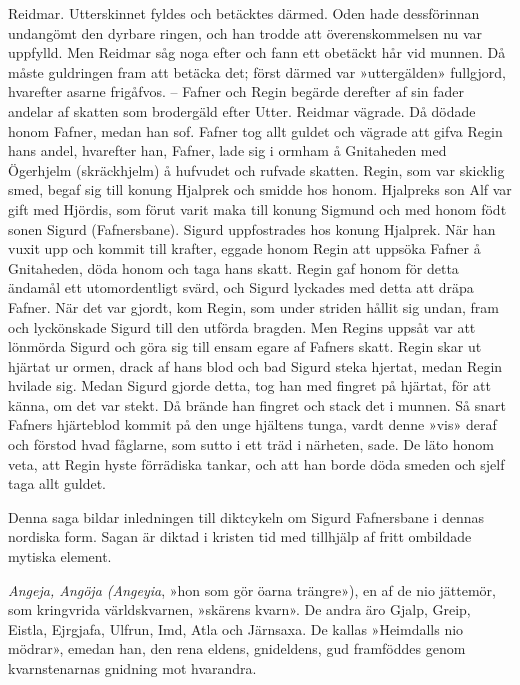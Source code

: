 Reidmar. Utterskinnet fyldes och betäcktes därmed. Oden hade
dessförinnan undangömt den dyrbare ringen, och han trodde att
överenskommelsen nu var uppfylld. Men Reidmar såg noga efter och fann
ett obetäckt hår vid munnen. Då måste guldringen fram att betäcka det;
först därmed var »uttergälden» fullgjord, hvarefter asarne frigåfvos. --
Fafner och Regin begärde derefter af sin fader andelar af skatten som
brodergäld efter Utter. Reidmar vägrade. Då dödade honom Fafner, medan
han sof. Fafner tog allt guldet och vägrade att gifva Regin hans andel,
hvarefter han, Fafner, lade sig i ormham å Gnitaheden med Ögerhjelm
(skräckhjelm) å hufvudet och rufvade skatten. Regin, som var skicklig
smed, begaf sig till konung Hjalprek och smidde hos honom. Hjalpreks son
Alf var gift med Hjördis, som förut varit maka till konung Sigmund och
med honom födt sonen Sigurd (Fafnersbane). Sigurd uppfostrades hos
konung Hjalprek. När han vuxit upp och kommit till krafter, eggade honom
Regin att uppsöka Fafner å Gnitaheden, döda honom och taga hans skatt.
Regin gaf honom för detta ändamål ett utomordentligt svärd, och Sigurd
lyckades med detta att dräpa Fafner. När det var gjordt, kom Regin, som
under striden hållit sig undan, fram och lyckönskade Sigurd till den
utförda bragden. Men Regins uppsåt var att lönmörda Sigurd och göra sig
till ensam egare af Fafners skatt. Regin skar ut hjärtat ur ormen, drack
af hans blod och bad Sigurd steka hjertat, medan Regin hvilade sig.
Medan Sigurd gjorde detta, tog han med fingret på hjärtat, för att
känna, om det var stekt. Då brände han fingret och stack det i munnen.
Så snart Fafners hjärteblod kommit på den unge hjältens tunga, vardt
denne »vis» deraf och förstod hvad fåglarne, som sutto i ett träd i
närheten, sade. De läto honom veta, att Regin hyste förrädiska tankar,
och att han borde döda smeden och sjelf taga allt guldet.

Denna saga bildar inledningen till diktcykeln om Sigurd
Fafnersbane\protect\hypertarget{lb1625905.xhtmlux5cux23start203}{}{}\protect\hypertarget{lb1625905.xhtmlux5cux23start203-a}{}{}\protect\hypertarget{lb1625905.xhtmlux5cux23start203-b}{}{}\protect\hypertarget{lb1625905.xhtmlux5cux23start203-c}{}{}\protect\hypertarget{lb1625905.xhtmlux5cux23start203-d}{}{}
i dennas nordiska form. Sagan är diktad i kristen tid med tillhjälp af
fritt ombildade mytiska element.

\emph{Angeja, Angöja (Angeyia}, »hon som gör öarna trängre»), en af de
nio jättemör, som kringvrida världskvarnen, »skärens kvarn». De andra
äro Gjalp, Greip, Eistla, Ejrgjafa, Ulfrun, Imd, Atla och Järnsaxa. De
kallas »Heimdalls nio mödrar», emedan han, den rena eldens, gnideldens,
gud framföddes genom kvarnstenarnas gnidning mot hvarandra.

